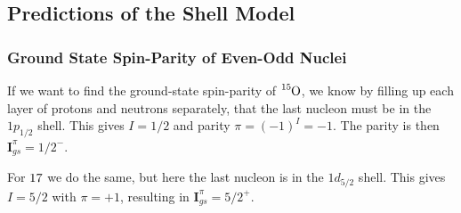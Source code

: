 \subsection{Predictions of the Shell Model}
\subsubsection{Ground State Spin-Parity of Even-Odd Nuclei}
If we want to find the ground-state spin-parity of $\ce{_{}^{15}\text{O}_{}}$, we know by filling up each layer of protons and neutrons separately, that the last nucleon must be in the $1p_{1 / 2}$ shell. This gives $I = 1 / 2$ and parity $π = (-1)^I = -1$. The parity is then $\mathbf{I}^{π}_{gs} = 1 / 2 ^{-}$. 

For $\ce{_{}^{}\text{17}_{}}$ we do the same, but here the last nucleon is in the $1d_{5 / 2}$ shell. This gives $I = 5 / 2$ with $π = +1$, resulting in $\mathbf{I}^{π}_{gs} = 5 / 2 ^{+}$.